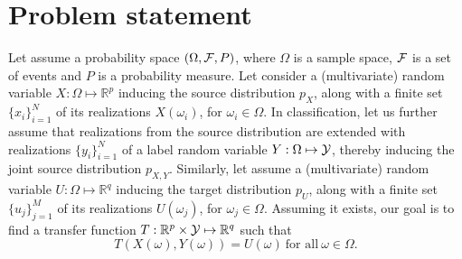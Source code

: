\documentclass{article}
\theoremstyle{plain}
\begin{document}




\section{Problem statement}

Let assume a probability space $(\Omega, {\cal F}, P)$, where $\Omega$ is a
sample space, ${\cal F}$ is a set of events and $P$ is a probability measure.
Let consider a (multivariate) random variable $X: \Omega \mapsto
\mathbb{R}^p$ inducing the source distribution $p_X$, along with a
finite set $\{x_i\}_{i=1}^N$ of its realizations $X(\omega_i)$, for $\omega_i
\in \Omega$.
In classification,
let us further assume that realizations from the source distribution are extended with realizations $\{y_i\}_{i=1}^N$
of a label random variable $Y:\Omega \mapsto {\cal Y}$, thereby inducing the joint source distribution $p_{X,Y}$.
Similarly, let assume a (multivariate) random variable $U: \Omega
\mapsto \mathbb{R}^q$ inducing the target distribution $p_U$, along with a finite set
$\{u_j\}_{j=1}^M$ of its realizations $U(\omega_j)$, for $\omega_j \in \Omega$.
Assuming it exists, our goal is to find a transfer function $T: \mathbb{R}^p \times {\cal Y}
\mapsto \mathbb{R}^q$ such that
\begin{equation}\label{eqn:tf}
T(X(\omega), Y(\omega)) = U(\omega) ~\text{for all}~ \omega \in \Omega.
\end{equation}
\end{document}
